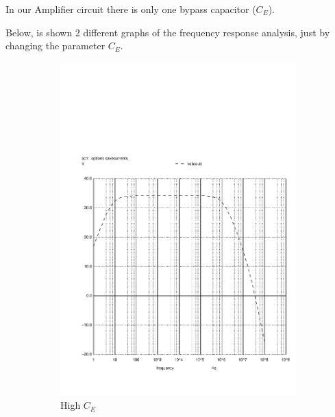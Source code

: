 In our Amplifier circuit there is only one bypass capacitor ($C_E$).\par 
Below, is shown 2 different graphs of the frequency response analysis, just by changing the parameter $C_E$.

\begin{figure}[H] 
\centering
\begin{subfigure}{0.4\textwidth}
\includegraphics[width=\textwidth]{c2high.pdf}
\caption{High $C_E$}
\label{highce}
\end{subfigure}
\begin{subfigure}{0.3\textwidth}

\end{subfigure}
\end{figure}
